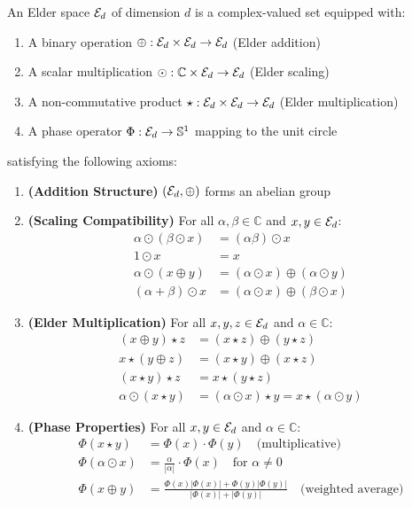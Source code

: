 \begin{definition}
An Elder space $\mathcal{E}_{d}$ of dimension $d$ is a complex-valued set equipped with:
\begin{enumerate}
    \item A binary operation $\oplus: \mathcal{E}_{d} \times \mathcal{E}_{d} \rightarrow \mathcal{E}_{d}$ (Elder addition)
    \item A scalar multiplication $\odot: \mathbb{C} \times \mathcal{E}_{d} \rightarrow \mathcal{E}_{d}$ (Elder scaling)
    \item A non-commutative product $\star: \mathcal{E}_{d} \times \mathcal{E}_{d} \rightarrow \mathcal{E}_{d}$ (Elder multiplication)
    \item A phase operator $\Phi: \mathcal{E}_{d} \rightarrow \mathbb{S}^1$ mapping to the unit circle
\end{enumerate}
satisfying the following axioms:
\begin{enumerate}[label=\textbf{A\arabic*}]
    \item \textbf{(Addition Structure)} $(\mathcal{E}_{d}, \oplus)$ forms an abelian group
    \item \textbf{(Scaling Compatibility)} For all $\alpha, \beta \in \mathbb{C}$ and $x, y \in \mathcal{E}_{d}$:
    \begin{align}
        \alpha \odot (\beta \odot x) &= (\alpha\beta) \odot x\\
        1 \odot x &= x\\
        \alpha \odot (x \oplus y) &= (\alpha \odot x) \oplus (\alpha \odot y)\\
        (\alpha + \beta) \odot x &= (\alpha \odot x) \oplus (\beta \odot x)
    \end{align}
    
    \item \textbf{(Elder Multiplication)} For all $x, y, z \in \mathcal{E}_{d}$ and $\alpha \in \mathbb{C}$:
    \begin{align}
        (x \oplus y) \star z &= (x \star z) \oplus (y \star z)\\
        x \star (y \oplus z) &= (x \star y) \oplus (x \star z)\\
        (x \star y) \star z &= x \star (y \star z)\\
        \alpha \odot (x \star y) &= (\alpha \odot x) \star y = x \star (\alpha \odot y)
    \end{align}
    
    \item \textbf{(Phase Properties)} For all $x, y \in \mathcal{E}_{d}$ and $\alpha \in \mathbb{C}$:
    \begin{align}
        \Phi(x \star y) &= \Phi(x) \cdot \Phi(y) \quad \text{(multiplicative)}\\
        \Phi(\alpha \odot x) &= \frac{\alpha}{|\alpha|} \cdot \Phi(x) \quad \text{for } \alpha \neq 0\\
        \Phi(x \oplus y) &= \frac{\Phi(x)|\Phi(x)| + \Phi(y)|\Phi(y)|}{|\Phi(x)| + |\Phi(y)|} \quad \text{(weighted average)}
    \end{align}
\end{enumerate}
\end{definition}

